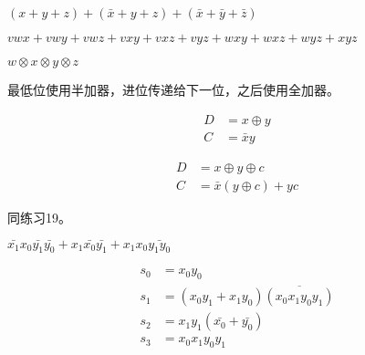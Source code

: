{{        %
        \begin{practices}
            $(x + y + z) + (\bar{x} + y + z) + (\bar{x} + \bar{y} + \bar{z})$
        \end{practices}

        \begin{practices}

        \end{practices}

        \begin{practices}
            $vwx + vwy + vwz + vxy + vxz + vyz + wxy + wxz + wyz + xyz$
        \end{practices}

        \begin{practices}
            $w \otimes x \otimes y \otimes z$
        \end{practices}

        \begin{practices}
            最低位使用半加器，进位传递给下一位，之后使用全加器。
        \end{practices}

        \begin{practices}
            \begin{align*}
                D &= x \oplus y \\
                C &= \bar{x}y
            \end{align*}
        \end{practices}

        \begin{practices}
            \begin{align*}
                D &= x \oplus y \oplus c \\
                C &= \bar{x}(y \oplus c) + yc
            \end{align*}
        \end{practices}

        \begin{practices}
            同练习19。
        \end{practices}

        \begin{practices}
            $\bar{x_1}x_0\bar{y_1}\bar{y_0} + x_1\bar{x_0}\bar{y_1} + x_1x_0\bar{y_1y_0}$
        \end{practices}

        \begin{practices}
            \begin{align*}
                s_0 &= x_0y_0 \\
                s_1 &= (x_0y_1 + x_1y_0)\overline{(x_0x_1y_0y_1)} \\
                s_2 &= x_1y_1(\bar{x_0} + \bar{y_0}) \\
                s_3 &= x_0x_1y_0y_1
            \end{align*}
        \end{practices}

}}
